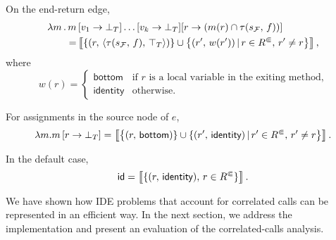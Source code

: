 On the end-return edge,
\begin{align}
  \lambda m\,.\,m&\left[v_1\to\bot_T\right]\dots[v_k\to\bot_T][r\to (m(r)\cap\tau(s_\mathcal F,\,f))]\notag
  \\=&\left\llbracket
    \{(r,\,\langle\tau(s_\mathcal F,\,f),\,\top_T\rangle)\}
    \cup
    \left\{(r',\,w(r'))\,|\,r\in{R^\Subset},\,r'\ne r
  \right\}\right\rrbracket,
\end{align}
where
\[
w(r)=\begin{cases}
      \textsf{bottom}&\text{if $r$ is a local variable in the exiting method,}\\
      \textsf{identity}&\text{otherwise}.
    \end{cases}
\]

For assignments in the source node of $e$,
\begin{align}
  \lambda m.m\left[r\to \bot_T\right]
  =\left\llbracket\left\{(r,\,\textsf{bottom})\}
    \cup
    \{(r',\,\textsf{identity})\,|\,r'\in {R^\Subset},\,r'\ne r\right\}\right\rrbracket.
\end{align}%

In the default case,
\[
  \textsf{id}
  =\left\llbracket\{(r,\,\textsf{identity}),\,r\in {R^\Subset}\}\right\rrbracket.
\]

We have shown how IDE problems that account for correlated calls can be represented in an efficient way. In the next section, we address the implementation and present an evaluation of the correlated-calls analysis.
